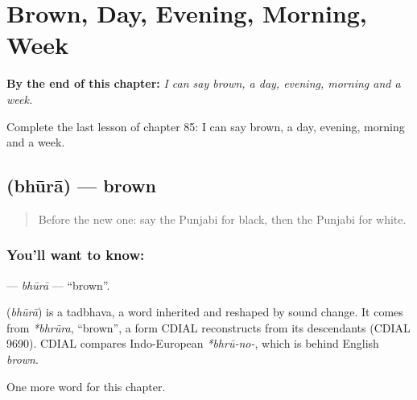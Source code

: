 
\chapter{Brown, Day, Evening, Morning, Week}
\label{ch:pa-brown-day-evening-morning-week}

\begin{chapteropening}
\textbf{By the end of this chapter:} \emph{I can say brown, a day, evening, morning and a week.}

Complete the last lesson of chapter 85: I can say brown, a day, evening, morning and a week.
\end{chapteropening}

\section[\texorpdfstring{\pa{ਭੂਰਾ} (bhūrā)}{ਭੂਰਾ (bhūrā)}]{ (bhūrā) — brown}

\label{lesson:PA-C85-bhura}



\begin{quote}
Before the new one: say the Punjabi for black, then the Punjabi for white.
\end{quote}

\subsection*{You'll want to know: }
\textbf{} — \emph{bhūrā} — \textquotedblleft{}brown\textquotedblright{}.

\begin{cousinweb}
\textbf{} (\emph{bhūrā}) is a tadbhava, a word inherited and reshaped by sound change. It comes from \emph{*bhrūra}, \textquotedblleft{}brown\textquotedblright{}, a form CDIAL reconstructs from its descendants (CDIAL 9690). CDIAL compares Indo-European \emph{*bhrū-no-}, which is behind English \emph{brown}.
\end{cousinweb}

\begin{grammarlens}[title={What you've built}]
One more word for this chapter.
\end{grammarlens}

